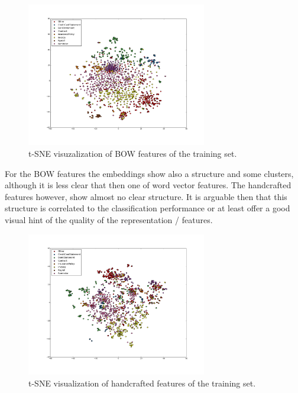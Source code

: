 \begin{figure}[ht!]
	\begin{center}

			\includegraphics[width=0.7\textwidth]{images/tse-tfidf-vectors.png} 

	\end{center}
        \caption{\ac{t-SNE} visuzalization of \ac{BOW} features of the training set.  }

	\label{fig:tsne_viz_2}
\end{figure}
 
For the \ac{BOW} features  the embeddings show also a  structure
and some clusters, although  it  is less clear that then one of word vector features. The
handcrafted  features however, show almost no clear structure. It is arguable then that this
structure is correlated to the classification performance or at least offer a
good visual hint of the quality of the representation / features. 
 

\begin{figure}[hptb!]
	\begin{center}

			\includegraphics[width=0.7\textwidth]{images/tse-handcrafted-vectors.pdf} 

	\end{center}
        \caption{\ac{t-SNE} visualization of handcrafted features of the training set.}
	\label{fig:tsne_viz_3}
\end{figure}
 

